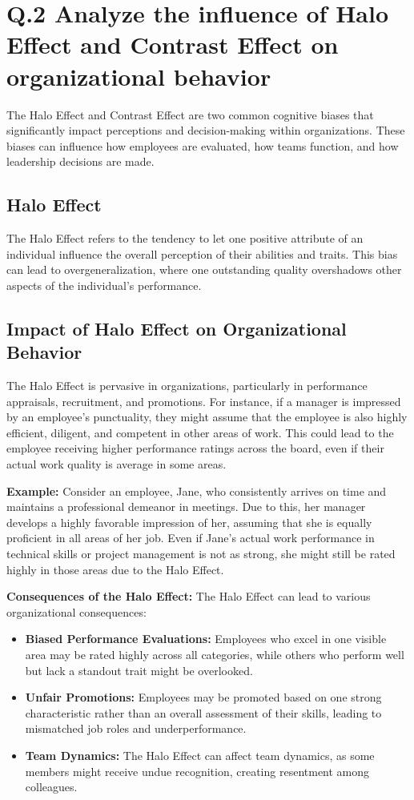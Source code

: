 \documentclass{article}
\begin{document}

\section*{Q.2 Analyze the influence of Halo Effect and Contrast Effect on organizational behavior}

The Halo Effect and Contrast Effect are two common cognitive biases that significantly impact perceptions and decision-making within organizations. These biases can influence how employees are evaluated, how teams function, and how leadership decisions are made.

\subsection*{Halo Effect}
The Halo Effect refers to the tendency to let one positive attribute of an individual influence the overall perception of their abilities and traits. This bias can lead to overgeneralization, where one outstanding quality overshadows other aspects of the individual’s performance.

\subsection*{Impact of Halo Effect on Organizational Behavior}
The Halo Effect is pervasive in organizations, particularly in performance appraisals, recruitment, and promotions. For instance, if a manager is impressed by an employee’s punctuality, they might assume that the employee is also highly efficient, diligent, and competent in other areas of work. This could lead to the employee receiving higher performance ratings across the board, even if their actual work quality is average in some areas.

\textbf{Example:}  
Consider an employee, Jane, who consistently arrives on time and maintains a professional demeanor in meetings. Due to this, her manager develops a highly favorable impression of her, assuming that she is equally proficient in all areas of her job. Even if Jane’s actual work performance in technical skills or project management is not as strong, she might still be rated highly in those areas due to the Halo Effect.

\textbf{Consequences of the Halo Effect:}  
The Halo Effect can lead to various organizational consequences:

\begin{itemize}
    \item \textbf{Biased Performance Evaluations:} Employees who excel in one visible area may be rated highly across all categories, while others who perform well but lack a standout trait might be overlooked.
    \item \textbf{Unfair Promotions:} Employees may be promoted based on one strong characteristic rather than an overall assessment of their skills, leading to mismatched job roles and underperformance.
    \item \textbf{Team Dynamics:} The Halo Effect can affect team dynamics, as some members might receive undue recognition, creating resentment among colleagues.
\end{itemize}
\end{document}
